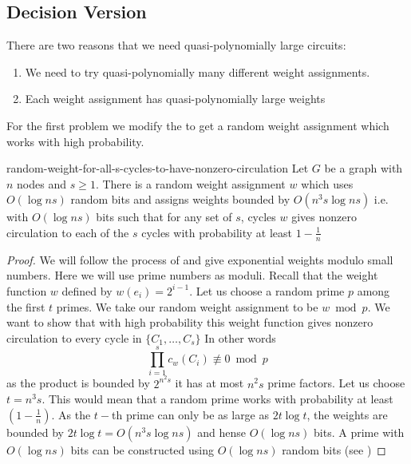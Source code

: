 \subsection{Decision Version}\label{rnc-few-random-decision}
There are two reasons that we need quasi-polynomially large circuits:\begin{enumerate}[label=(\roman*)]
\item We need to try quasi-polynomially many different weight assignments. 
\item Each weight assignment has quasi-polynomially large weights
\end{enumerate}
For the first problem we modify the  to get a random weight assignment which works with high probability.

\begin{lemma}{\cite{ChariRohatgiSrinivasan_1993_Rou_CONF, KlivansSpielman_2001_Rei_CONF}}{random-weight-for-all-s-cycles-to-have-nonzero-circulation}
	Let $G$ be a graph with $n$ nodes and $s\geq 1$. There is a random weight assignment $w$ which uses $O(\log ns)$ random bits and assigns weights bounded by $O(n^3s\log ns)$ i.e. with $O(\log ns)$ bits such that for any set of $s$, cycles $w$ gives nonzero circulation to each of the $s$ cycles with probability at least $1-\frac{1}{n}$
\end{lemma}
\begin{proof}
	We will follow the process of  and give exponential weights modulo small numbers. Here we will use prime numbers as moduli. Recall that the weight function $w$ defined by $w(e_i)=2^{i-1}$. Let us choose a random prime $p$ among the first $t$ primes. We take our random weight assignment to be $w\bmod p$. We want to show that with high probability this weight function gives nonzero circulation to every cycle in $\{C_1,\dots, C_s\}$ In other words \[
		 \prod\limits_{i=1}^{s} c_w(C_i)\not\equiv 0\bmod p			 
	\]
	as the product is bounded by $2^{n^2s}$ it has at most $n^2s$ prime factors. Let us choose $t=n^3s$. This would mean that a random prime works with probability at least $\left(1-\frac1n\right)$. As the $t-$th prime can only be as large as $2t\log t$, the weights are bounded by $2t\log t=O(n^3s\log ns)$ and hense $O(\log ns)$ bits. A prime with $O(\log ns)$ bits can be constructed using $O(\log ns)$ random bits (see \cite{KlivansSpielman_2001_Rei_CONF})
\end{proof}

